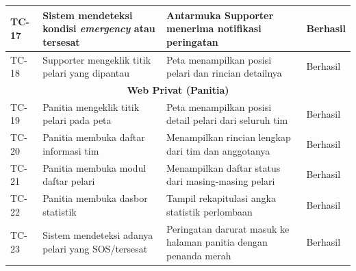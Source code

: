 \begin{longtable}{|p{1.2cm}|p{4.5cm}|p{5cm}|p{2cm}|}
TC-17 & Sistem mendeteksi kondisi \textit{emergency} atau tersesat & Antarmuka Supporter menerima notifikasi peringatan & Berhasil \\ \hline

TC-18 & Supporter mengeklik titik pelari yang dipantau & Peta menampilkan posisi pelari dan rincian detailnya & Berhasil \\ \hline


\multicolumn{4}{|c|}{\textbf{Web Privat (Panitia)}} \\ \hline

TC-19 & Panitia mengeklik titik pelari pada peta & Peta menampilkan posisi detail pelari dari seluruh tim & Berhasil \\ \hline

TC-20 & Panitia membuka daftar informasi tim & Menampilkan rincian lengkap dari tim dan anggotanya & Berhasil \\ \hline

TC-21 & Panitia membuka modul daftar pelari & Menampilkan daftar status dari masing-masing pelari & Berhasil \\ \hline

TC-22 & Panitia membuka dasbor statistik & Tampil rekapitulasi angka statistik perlombaan & Berhasil \\ \hline

TC-23 & Sistem mendeteksi adanya pelari yang SOS/tersesat & Peringatan darurat masuk ke halaman panitia dengan penanda merah & Berhasil \\ \hline

\end{longtable}
